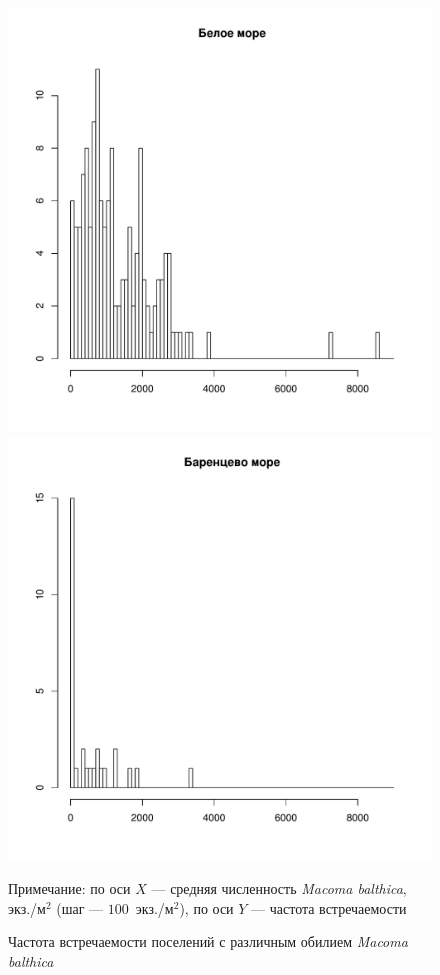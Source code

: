 	\begin{figure}[ht]
		\includegraphics[height=.3\textheight]{../All_N/Nmean_hist_White1.pdf}
		\includegraphics[height=.3\textheight]{../All_N/Nmean_hist_Barents1.pdf}
	\caption{Частота встречаемости поселений с различным обилием {\it Macoma balthica}}
	{\footnotesize Примечание: по оси $X$ --- средняя численность {\it Macoma balthica}, экз./м$^2$ (шаг --- $100$~экз./м$^2$), по оси $Y$ 	--- частота встречаемости}
	\label{ris:Nmean_hist}
	\end{figure}
